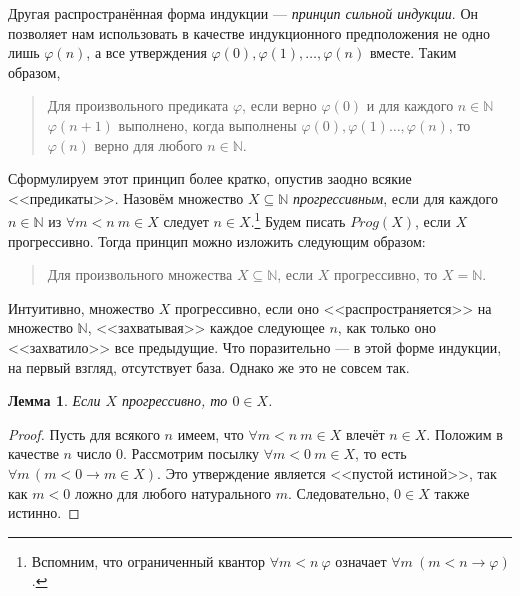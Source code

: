 \documentclass[12pt,notitlepage]{article}
\theoremstyle{plain}
\newtheorem{lemma}[thm]{Лемма}
\theoremstyle{definition}
\theoremstyle{plain}
\newcommand{\N}{\mathbb{N}}
\newcommand{\sbs}{\subseteq}
\renewcommand{\phi}{\varphi}
\newcommand{\1}{\mathbf{1}}
\newcommand{\0}{\mathbf{0}}
\newcommand{\mcomm}[1]{}
\begin{document}
Другая распространённая форма индукции --- \emph{принцип сильной индукции}. Он позволяет нам использовать в качестве индукционного предположения не одно лишь $\phi(n)$, а все утверждения $\phi(0), \phi(1),\ldots, \phi(n)$ вместе. Таким образом,
\begin{quote}
	Для произвольного предиката $\phi$, если верно $\phi(0)$ и для каждого $n \in \N$ $\phi(n+1)$ выполнено, когда выполнены $\phi(0), \phi(1) \ldots, \phi(n)$, то $\phi(n)$ верно для любого $n \in \N$.
\end{quote}
Сформулируем этот принцип более кратко, опустив заодно всякие <<предикаты>>.  Назовём множество $X \sbs \N$ \emph{прогрессивным}, если для каждого $n \in \N$ из $\forall m < n\  m \in X$ следует $n \in X$.\footnote{Вспомним, что ограниченный квантор $\forall m < n\ \phi$ означает $\forall m\ (m < n \to \phi)$.} Будем писать $Prog(X)$, если $X$ прогрессивно. Тогда принцип можно изложить следующим образом:
\begin{quote}
	Для произвольного множества $X \sbs \N$, если $X$ прогрессивно, то $X = \N$.
\end{quote}
\mcomm{Of course, the Instructor might prefer to call a \emph{predicate} progressive.}

Интуитивно, множество $X$ прогрессивно, если оно <<распространяется>> на множество $\N$, <<захватывая>> каждое следующее $n$, как только оно <<захватило>> все предыдущие. Что поразительно --- в этой форме индукции, на первый взгляд, отсутствует база. Однако же это не совсем так.

\mcomm{In practice, the students usually wonder where the base case has gone to.}
\begin{lemma}
	Если $X$ прогрессивно, то $0 \in X$.
\end{lemma}
\begin{proof}
	Пусть для всякого $n$ имеем, что $\forall m < n\ m \in X$ влечёт $n \in X$. Положим в качестве $n$ число $0$. Рассмотрим посылку $\forall m < 0\  m \in X$, то есть $\forall m\, (m < 0 \to m \in X)$. Это утверждение является <<пустой истиной>>, так как $m < 0$ ложно для любого натурального $m$. Следовательно, $0 \in X$ также истинно.
\end{proof}
\end{document}

